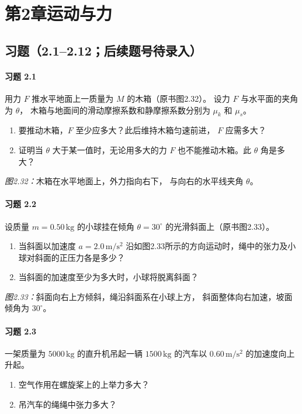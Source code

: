 \section*{第2章\quad 运动与力}
\subsection*{习题（2.1--2.12；后续题号待录入）}

\paragraph{习题 2.1}
用力 \(F\) 推水平地面上一质量为 \(M\) 的木箱（原书图2.32）。
设力 \(F\) 与水平面的夹角为 \(\theta\)，
木箱与地面间的滑动摩擦系数和静摩擦系数分别为
\(\mu_k\) 和 \(\mu_s\)。
\begin{enumerate}
\item 要推动木箱，\(F\) 至少应多大？此后维持木箱匀速前进，
\(F\) 应需多大？
\item 证明当 \(\theta\) 大于某一值时，无论用多大的力
\(F\) 也不能推动木箱。此 \(\theta\) 角是多大？
\end{enumerate}
\textit{图2.32：}木箱在水平地面上，外力指向右下，
与向右的水平线夹角 \(\theta\)。

\paragraph{习题 2.2}
设质量 \(m=0.50\,\mathrm{kg}\) 的小球挂在倾角 \(\theta=30^\circ\)
的光滑斜面上（原书图2.33）。
\begin{enumerate}
\item 当斜面以加速度 \(a=2.0\,\mathrm{m/s^2}\)
沿如图2.33所示的方向运动时，绳中的张力及小球对斜面的正压力各是多少？
\item 当斜面的加速度至少为多大时，小球将脱离斜面？
\end{enumerate}
\textit{图2.33：}斜面向右上方倾斜，绳沿斜面系在小球上方，
斜面整体向右加速，坡面倾角为 \(30^\circ\)。

\paragraph{习题 2.3}
一架质量为 \(5000\,\mathrm{kg}\) 的直升机吊起一辆
\(1500\,\mathrm{kg}\) 的汽车以 \(0.60\,\mathrm{m/s^2}\)
的加速度向上升起。
\begin{enumerate}
\item 空气作用在螺旋桨上的上举力多大？
\item 吊汽车的绳绳中张力多大？
\end{enumerate}


